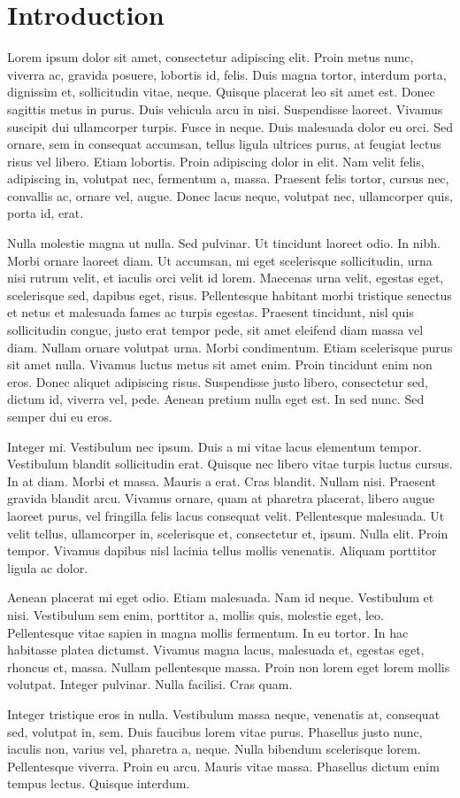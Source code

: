 \chapter{Introduction}

Lorem ipsum dolor sit amet, consectetur adipiscing elit. Proin metus nunc, viverra ac, gravida 
posuere, lobortis id, felis. Duis magna tortor, interdum porta, dignissim et, sollicitudin vitae, 
neque. Quisque placerat leo sit amet est. Donec sagittis metus in purus. Duis vehicula arcu in 
nisi. Suspendisse laoreet. Vivamus suscipit dui ullamcorper turpis. Fusce in neque. Duis malesuada 
dolor eu orci. Sed ornare, sem in consequat accumsan, tellus ligula ultrices purus, at feugiat 
lectus risus vel libero. Etiam lobortis. Proin adipiscing dolor in elit. Nam velit felis, 
adipiscing in, volutpat nec, fermentum a, massa. Praesent felis tortor, cursus nec, convallis ac, 
ornare vel, augue. Donec lacus neque, volutpat nec, ullamcorper quis, porta id, erat.

Nulla molestie magna ut nulla. Sed pulvinar. Ut tincidunt laoreet odio. In nibh. Morbi ornare laoreet diam. Ut accumsan, mi eget scelerisque sollicitudin, urna nisi rutrum velit, et iaculis orci velit id lorem. Maecenas urna velit, egestas eget, scelerisque sed, dapibus eget, risus. Pellentesque habitant morbi tristique senectus et netus et malesuada fames ac turpis egestas. Praesent tincidunt, nisl quis sollicitudin congue, justo erat tempor pede, sit amet eleifend diam massa vel diam. Nullam ornare volutpat urna. Morbi condimentum. Etiam scelerisque purus sit amet nulla. Vivamus luctus metus sit amet enim. Proin tincidunt enim non eros. Donec aliquet adipiscing risus. Suspendisse justo libero, consectetur sed, dictum id, viverra vel, pede. Aenean pretium nulla eget est. In sed nunc. Sed semper dui eu eros.

Integer mi. Vestibulum nec ipsum. Duis a mi vitae lacus elementum tempor. Vestibulum blandit sollicitudin erat. Quisque nec libero vitae turpis luctus cursus. In at diam. Morbi et massa. Mauris a erat. Cras blandit. Nullam nisi. Praesent gravida blandit arcu. Vivamus ornare, quam at pharetra placerat, libero augue laoreet purus, vel fringilla felis lacus consequat velit. Pellentesque malesuada. Ut velit tellus, ullamcorper in, scelerisque et, consectetur et, ipsum. Nulla elit. Proin tempor. Vivamus dapibus nisl lacinia tellus mollis venenatis. Aliquam porttitor ligula ac dolor.

Aenean placerat mi eget odio. Etiam malesuada. Nam id neque. Vestibulum et nisi. Vestibulum sem enim, porttitor a, mollis quis, molestie eget, leo. Pellentesque vitae sapien in magna mollis fermentum. In eu tortor. In hac habitasse platea dictumst. Vivamus magna lacus, malesuada et, egestas eget, rhoncus et, massa. Nullam pellentesque massa. Proin non lorem eget lorem mollis volutpat. Integer pulvinar. Nulla facilisi. Cras quam.

Integer tristique eros in nulla. Vestibulum massa neque, venenatis at, consequat sed, volutpat in, 
sem. Duis faucibus lorem vitae purus. Phasellus justo nunc, iaculis non, varius vel, pharetra a, 
neque. Nulla bibendum scelerisque lorem. Pellentesque viverra. Proin eu arcu. Mauris vitae massa. 
Phasellus dictum enim tempus lectus. Quisque interdum. 	